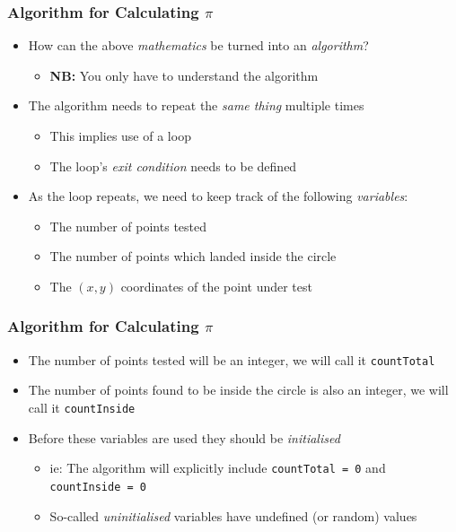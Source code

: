 \documentclass[14pt]{beamer}
\begin{document}
\begin{frame}
\frametitle{Algorithm for Calculating $\pi$}

\begin{itemize}
\item How can the above \textit{mathematics} be turned into an \textit{algorithm}?
	\begin{itemize}
		\item \textbf{NB:} You only have to understand the algorithm
	\end{itemize}
\item The algorithm needs to repeat the \textit{same thing} multiple times
	\begin{itemize}
			\item This implies use of a loop
			\item The loop's \textit{exit condition} needs to be defined
	\end{itemize}
\item As the loop repeats, we need to keep track of the following \textit{variables}:
		\begin{itemize}
			\item The number of points tested
			\item The number of points which landed inside the circle
			\item The $(x,y)$ coordinates of the point under test
		\end{itemize}


\end{itemize}	 
\end{frame}

\begin{frame}
\frametitle{Algorithm for Calculating $\pi$}
\begin{itemize}
\item The number of points tested will be an integer, we will call it \texttt{countTotal}
\item The number of points found to be inside the circle is also an integer, we will call it \texttt{countInside}
\item Before these variables are used they should be \textit{initialised}
	\begin{itemize}
		\item ie: The algorithm will explicitly include \texttt{countTotal = 0} and \texttt{countInside = 0}
		\item So-called \textit{uninitialised} variables have undefined (or random) values
	\end{itemize}
\end{itemize}
\end{frame}
\end{document}
